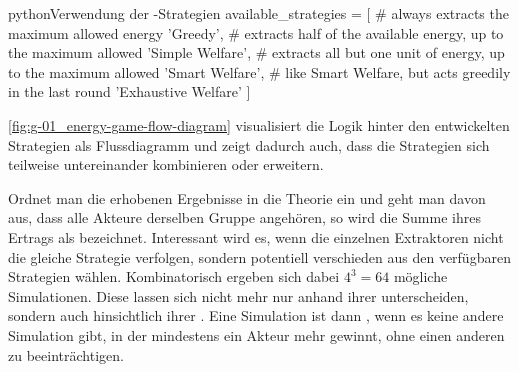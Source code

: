 \begin{snippet}[htb]
    \centering
    \begin{codebox}{python}{Verwendung der -Strategien}
        available_strategies = [
            # always extracts the maximum allowed energy
            'Greedy',               
            # extracts half of the available energy, up to the maximum allowed
            'Simple Welfare',       
            # extracts all but one unit of energy, up to the maximum allowed
            'Smart Welfare',        
            # like Smart Welfare, but acts greedily in the last round
            'Exhaustive Welfare'    
        ]
    \end{codebox}
    \caption{Verwendung der -Strategien}
    \label{snippet:02-03_welfare-strategies-usage}
\end{snippet}

\autoref{fig:g-01_energy-game-flow-diagram} visualisiert die Logik hinter den entwickelten Strategien als Flussdiagramm und zeigt dadurch auch, dass die Strategien sich teilweise untereinander kombinieren oder erweitern.

Ordnet man die erhobenen Ergebnisse in die Theorie ein und geht man davon aus, dass alle Akteure derselben Gruppe angehören, so wird die Summe ihres Ertrags als  \cite[S. 42]{004_KII12_distributed-artificial-intelligence-and-machine-learning} bezeichnet. Interessant wird es, wenn die einzelnen Extraktoren nicht die gleiche Strategie verfolgen, sondern potentiell verschieden aus den verfügbaren Strategien wählen. Kombinatorisch ergeben sich dabei $4^3 = 64$ mögliche Simulationen. Diese lassen sich nicht mehr nur anhand ihrer  unterscheiden, sondern auch hinsichtlich ihrer  \cite[S. 42]{004_KII12_distributed-artificial-intelligence-and-machine-learning}. Eine Simulation ist dann , wenn es keine andere Simulation gibt, in der mindestens ein Akteur mehr gewinnt, ohne einen anderen zu beeinträchtigen.

